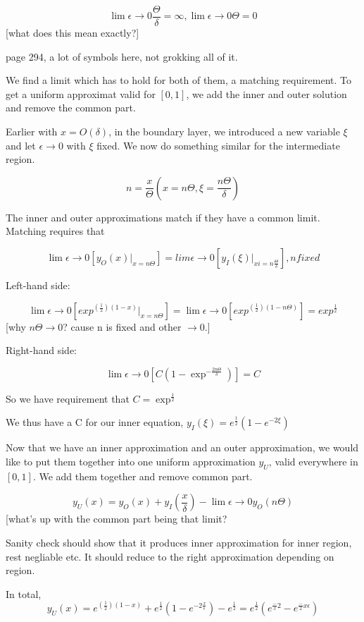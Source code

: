 \documentclass[12pt]{report}
\begin{document}
$$\lim \epsilon \to 0 \frac \Theta \delta = \infty, \lim \epsilon \to 0 \Theta =
0$$ [what does this mean exactly?]

page 294, a lot of symbols here, not grokking all of it.

We find a limit which has to hold for both of them, a matching requirement. To
get a uniform approximat valid for $[0,1]$, we add the inner and outer solution
and remove the common part.

Earlier with $x=O(\delta)$, in the boundary layer, we introduced a new variable
$\xi$ and let $\epsilon \to 0$ with $\xi$ fixed. We now do something similar for
the intermediate region.

$$n = \frac x \Theta  (x = n \Theta, \xi = \frac{n \Theta}{\delta})$$

The inner and outer approximations match if they have a common limit. Matching
requires that

$$\lim \epsilon \to 0[y_O(x) |_{x=n \Theta}] = lim \epsilon \to
0[y_I(\xi)|_{xi=n \frac \Theta \delta}], n fixed$$

Left-hand side:

$$\lim \epsilon \to 0[exp^{(\frac 1 2)(1-x)} |_{x=n \Theta}] = \lim \epsilon \to
0[exp^{(\frac 1 2)(1- n \Theta)}] = exp^{\frac 1 2} $$ [why $n \Theta \to 0$?
cause n is fixed and other $\to 0$.]

Right-hand side:

$$\lim \epsilon \to 0[C(1-\exp^{-\frac{2n \Theta}{\delta}})] = C$$

So we have requirement that $C = \exp^{\frac 1 2}$

We thus have a C for our inner equation, $y_I(\xi) = e^{\frac 1
2}(1-e^{-2\xi})$

Now that we have an inner approximation and an outer approximation, we would
like to put them together into one uniform approximation $y_U$, valid everywhere
in $[0,1]$. We add them together and remove common part.

$$y_U(x) = y_O(x) + y_I(\frac x \delta) - \lim \epsilon \to 0 y_O(n \Theta)$$
[what's up with the common part being that limit?

Sanity check should show that it produces inner approximation for inner region,
rest negliable etc. It should reduce to the right approximation depending on
region.

In total, $$y_U(x) = e^{(\frac 1 2)(1-x)} + e^{\frac 1 2}(1 - e^{-2\frac x
\epsilon}) - e^{\frac 1 2} = e^{\frac 1 2}(e^{\frac -x 2} - e^{\frac -2x
\epsilon})$$
\end{document}
